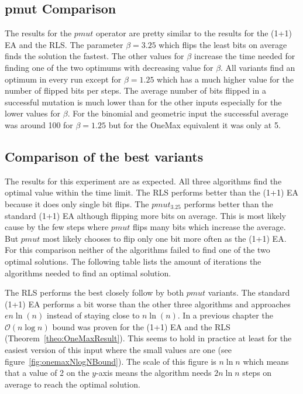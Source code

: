 \subsection{pmut Comparison}



The results for the $pmut$ operator are pretty similar to the results for the (1+1) EA and the RLS.
The parameter $\beta=3.25$ which flips the least bits on average finds the solution the fastest.
The other values for $\beta$ increase the time needed for finding one of the two optimums with decreasing value for $\beta$.
All variants find an optimum in every run except for $\beta=1.25$ which has a much higher value for the number of flipped bits per steps.
The average number of bits flipped in a successful mutation is much lower than for the other inputs especially for the lower values for $\beta$.
For the binomial and geometric input the successful average was around 100 for $\beta=1.25$ but for the OneMax equivalent it was only at 5.

\subsection{Comparison of the best variants}



The results for this experiment are as expected.
All three algorithms find the optimal value within the time limit.
The RLS performs better than the (1+1) EA because it does only single bit flips.
The $pmut_{3.25}$ performs better than the standard (1+1) EA although flipping more bits on average.
This is most likely cause by the few steps where $pmut$ flips many bits which increase the average.
But $pmut$ most likely chooses to flip only one bit more often as the (1+1) EA.\newline
For this comparison neither of the algorithms failed to find one of the two optimal solutions.
The following table lists the amount of iterations the algorithms needed to find an optimal solution.



The RLS performs the best closely follow by both $pmut$ variants.
The standard (1+1) EA performs a bit worse than the other three algorithms and approaches $en\ln(n)$ instead of staying close to $n\ln(n)$.
In a previous chapter the $\mathcal{O}(n\log n)$ bound was proven for the (1+1) EA and the RLS (Theorem~\ref{theo:OneMaxResult}).
This seems to hold in practice at least for the easiest version of this input where the small values are one (see figure~\ref{fig:onemaxNlogNBound}).
The scale of this figure is $n\ln n$ which means that a value of 2 on the $y$-axis means the algorithm needs $2n\ln n$ steps on average to reach the optimal solution.

